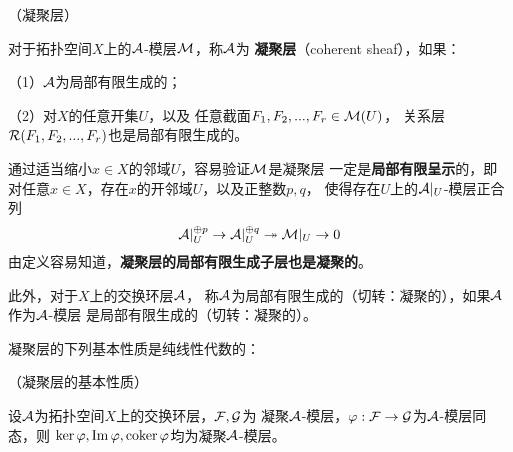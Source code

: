 \begin{definition}（凝聚层）

对于拓扑空间$X$上的$\mathcal{A}$-模层$\mathcal{M}$，称$\mathcal{A}$为
\textbf{凝聚层}（coherent sheaf），如果：

（1）$\mathcal{A}$为局部有限生成的；

（2）对$X$的任意开集$U$，以及
任意截面$F_1,F_2,...,F_r\in\mathcal{M}(U)$，
关系层$\mathcal{R}(F_1,F_2,...,F_r)$也是局部有限生成的。
\end{definition}

通过适当缩小$x\in X$的邻域$U$，容易验证$\mathcal{M}$是凝聚层
一定是\textbf{局部有限呈示}的，即
对任意$x\in X$，存在$x$的开邻域$U$，以及正整数$p,q$，
使得存在$U$上的$\mathcal{A}|_U$-模层正合列
$$
  \mathcal{A}|_U^{\oplus p}\to
  \mathcal{A}|_U^{\oplus q}\twoheadrightarrow
  \mathcal{M}|_U\to 0
$$
由定义容易知道，\textbf{凝聚层的局部有限生成子层也是凝聚的}。

此外，对于$X$上的交换环层$\mathcal{A}$，
称$\mathcal{A}$为局部有限生成的（切转：凝聚的），如果$\mathcal{A}$作为$\mathcal{A}$-模层
是局部有限生成的（切转：凝聚的）。

凝聚层的下列基本性质是纯线性代数的：

\begin{prop}（凝聚层的基本性质）

设$\mathcal{A}$为拓扑空间$X$上的交换环层，$\mathcal{F},\mathcal{G}$为
凝聚$\mathcal{A}$-模层，$\varphi:\mathcal{F}\to\mathcal{G}$为$\mathcal{A}$-模层同态，则
$\ker\varphi,\operatorname{Im}\varphi,\operatorname{coker}\varphi$均为凝聚$\mathcal{A}$-模层。
\end{prop}

